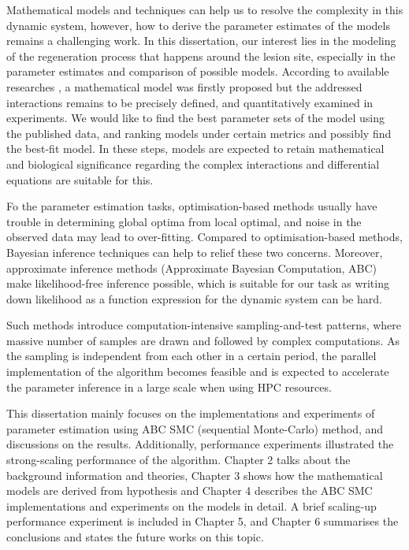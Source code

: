 Mathematical models and techniques can help us to resolve the complexity in this dynamic system, however, how to derive the parameter estimates of the models remains a challenging work. In this dissertation, our interest lies in the modeling of the regeneration process that happens around the lesion site, especially in the parameter estimates and comparison of possible models. According to available researches \cite{ref:Tsarouchas}, a mathematical model was firstly proposed but the addressed interactions remains to be precisely defined, and quantitatively examined in experiments. We would like to find the best parameter sets of the model using the published data, and ranking models under certain metrics and possibly find the best-fit model. In these steps, models are expected to retain mathematical and biological significance regarding the complex interactions and differential equations are suitable for this.


Fo the parameter estimation tasks, optimisation-based methods usually have trouble in determining global optima from local optimal, and noise in the observed data may lead to over-fitting. Compared to optimisation-based methods, Bayesian inference techniques can help to relief these two concerns\cite{ref:abcsysbio}. Moreover, approximate inference methods (Approximate Bayesian Computation, ABC) make likelihood-free inference possible, which is suitable for our task as writing down likelihood as a function expression for the dynamic system can be hard.

Such methods introduce computation-intensive sampling-and-test patterns, where massive number of samples are drawn and followed by complex computations. As the sampling is independent from each other in a certain period, the parallel implementation of the algorithm becomes feasible and is expected to accelerate the parameter inference in a large scale when using HPC resources.

This dissertation mainly focuses on the implementations and experiments of parameter estimation using ABC SMC (sequential Monte-Carlo) method, and discussions on the results. Additionally, performance experiments illustrated the strong-scaling performance of the algorithm. Chapter 2 talks about the background information and theories, Chapter 3 shows how the mathematical models are derived from hypothesis and Chapter 4 describes the ABC SMC implementations and experiments on the models in detail. A brief scaling-up performance experiment is included in Chapter 5, and Chapter 6 summarises the conclusions and states the future works on this topic.
